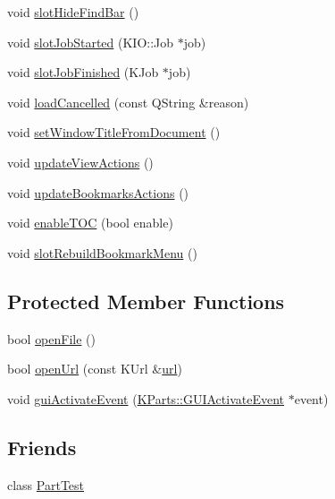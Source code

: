 \begin{DoxyCompactItemize}
\item 
void \hyperlink{classOkular_1_1Part_a74172e82ed71c5283c244ad5519af9fb}{slot\+Hide\+Find\+Bar} ()
\item 
void \hyperlink{classOkular_1_1Part_a995f0f59f0b748037f1680210fe9801b}{slot\+Job\+Started} (K\+I\+O\+::\+Job $\ast$job)
\item 
void \hyperlink{classOkular_1_1Part_a9933428a7fd8e99032b318de156d4e00}{slot\+Job\+Finished} (K\+Job $\ast$job)
\item 
void \hyperlink{classOkular_1_1Part_a50ed41cb584b4688ce82139dd28c9bf3}{load\+Cancelled} (const Q\+String \&reason)
\item 
void \hyperlink{classOkular_1_1Part_afb7d48e69af54832180de532dcb40075}{set\+Window\+Title\+From\+Document} ()
\item 
void \hyperlink{classOkular_1_1Part_aa1b8d92628f48722a0538d5579451bc1}{update\+View\+Actions} ()
\item 
void \hyperlink{classOkular_1_1Part_a656b4617883cedc523c95af55fff8d21}{update\+Bookmarks\+Actions} ()
\item 
void \hyperlink{classOkular_1_1Part_a4b428bf81d55d103fab30b3561a86feb}{enable\+T\+O\+C} (bool enable)
\item 
void \hyperlink{classOkular_1_1Part_a37027ec2955fe4e9d390a086119a23a4}{slot\+Rebuild\+Bookmark\+Menu} ()
\end{DoxyCompactItemize}
\subsection*{Protected Member Functions}
\begin{DoxyCompactItemize}
\item 
bool \hyperlink{classOkular_1_1Part_ab16af0c1fbc997d514c895836b93ae95}{open\+File} ()
\item 
bool \hyperlink{classOkular_1_1Part_af2a25b12165df885a959622966c2a852}{open\+Url} (const K\+Url \&\hyperlink{classKParts_1_1ReadOnlyPart_a5b8edbf05a338814287496882adde559}{url})
\item 
void \hyperlink{classOkular_1_1Part_a71ea7975f3f712fff8f91ce47a80149c}{gui\+Activate\+Event} (\hyperlink{classKParts_1_1GUIActivateEvent}{K\+Parts\+::\+G\+U\+I\+Activate\+Event} $\ast$event)
\end{DoxyCompactItemize}
\subsection*{Friends}
\begin{DoxyCompactItemize}
\item 
class \hyperlink{classOkular_1_1Part_a506849dde5538acb4477b6a860dd750e}{Part\+Test}
\end{DoxyCompactItemize}
